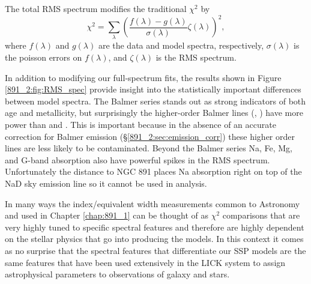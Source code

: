 The total RMS spectrum modifies the traditional $\chi^2$ by
\begin{equation}
\label{891_2:eq:smart_chi}
\chi^2 = \sum_{\lambda}\left(\frac{f(\lambda) -
  g(\lambda)}{\sigma(\lambda)}\zeta(\lambda)\right)^2,
\end{equation}
where $f(\lambda)$ and $g(\lambda)$ are the data and model spectra,
respectively, $\sigma(\lambda)$ is the poisson errors on $f(\lambda)$, and
$\zeta(\lambda)$ is the RMS spectrum.



In addition to modifying our full-spectrum fits, the results shown in
Figure \ref{891_2:fig:RMS_spec} provide insight into the statistically
important differences between model spectra. The Balmer series stands
out as strong indicators of both age and metallicity, but surprisingly
the higher-order Balmer lines (\Hd, \Hg) have more power than \HB and
\Ha. This is important because in the absence of an accurate
correction for Balmer emission (\S\ref{891_2:sec:emission_corr}) these
higher order lines are less likely to be contaminated. Beyond the
Balmer series Na, Fe, Mg, and G-band absorption also have powerful
spikes in the RMS spectrum. Unfortunately the distance to NGC 891
places Na absorption right on top of the NaD sky emission line so it
cannot be used in analysis. 

In many ways the index/equivalent width measurements common to
Astronomy and used in Chapter \ref{chap:891_1} can be thought of as
$\chi^2$ comparisons that are very highly tuned to specific spectral
features and therefore are highly dependent on the stellar physics
that go into producing the models. In this context it comes as no
surprise that the spectral features that differentiate our SSP models
are the same features that have been used extensively in the LICK
system to assign astrophysical parameters to observations of galaxy
and stars.

